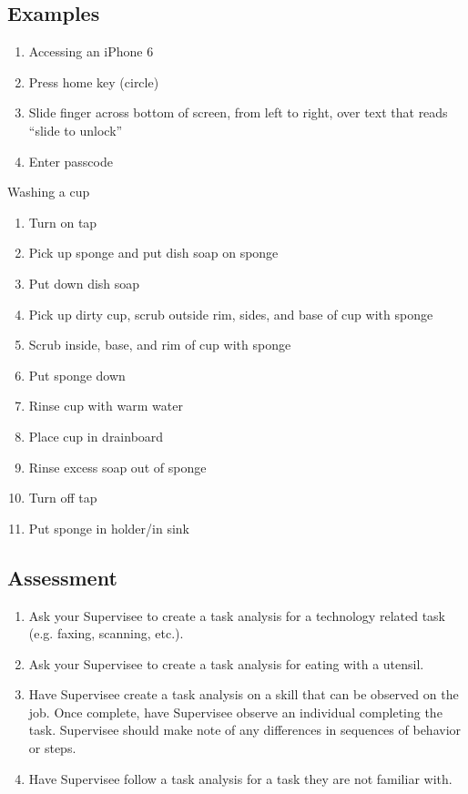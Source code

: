 \subsection{Examples}
\begin{enumerate}
\item Accessing an iPhone 6
\item Press home key (circle) 
\item Slide finger across bottom of screen, from left to right, over text that reads ``slide to unlock''
\item Enter passcode
\end{enumerate}
%
Washing a cup
\begin{enumerate}
\item Turn on tap
\item Pick up sponge and put dish soap on sponge
\item Put down dish soap
\item Pick up dirty cup, scrub outside rim, sides, and base of cup with sponge
\item Scrub inside, base, and rim of cup with sponge
\item Put sponge down
\item Rinse cup with warm water
\item Place cup in drainboard 
\item Rinse excess soap out of sponge
\item Turn off tap
\item Put sponge in holder/in sink
\end{enumerate}
%
\subsection{Assessment}
\begin{enumerate}
\item Ask your Supervisee to create a task analysis for a technology related task (e.g. faxing, scanning, etc.).
\item Ask your Supervisee to create a task analysis for eating with a utensil. 
\item Have Supervisee create a task analysis on a skill that can be observed on the job. Once complete, have Supervisee observe an individual completing the task. Supervisee should make note of any differences in sequences of behavior or steps.
\item Have Supervisee follow a task analysis for a task they are not familiar with.
\end{enumerate}
%

